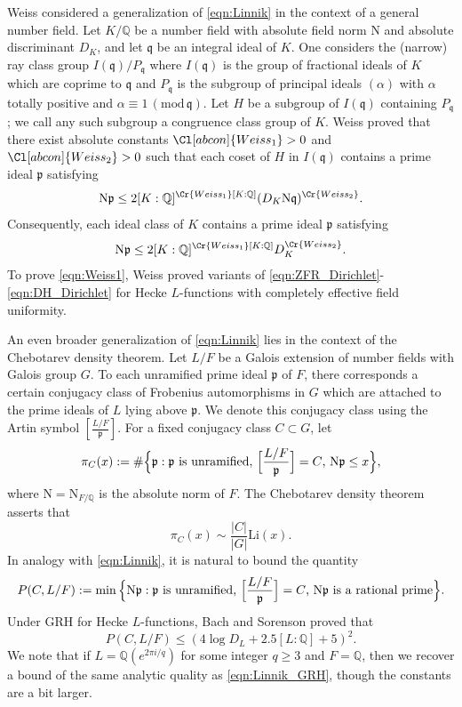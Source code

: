 \documentclass[12pt,psamsfonts]{amsart}
\theoremstyle{definition}
\theoremstyle{remark}
\numberwithin{equation}{section}
\theoremstyle{plain}
\theoremstyle{remark}
\renewcommand{\1}{ {\bf 1}}
\renewcommand{\pmod}[1]{\, (\mathrm{mod} {\, #1})}
\newcommand{\kp}{\mathfrak{p}}
\newcommand{\kq}{\mathfrak{q}}
\newcommand{\Q}{\mathbb{Q}}
\begin{document}
Weiss \cite{Weiss} considered a generalization of \eqref{eqn:Linnik} in the context of a general number field.  Let $K/\Q$ be a number field with absolute field norm $\mathrm{N}$ and absolute discriminant $D_K$, and let $\mathfrak{q}$ be an integral ideal of $K$.  One considers the (narrow) ray class group  $I(\mathfrak{q})/P_{\mathfrak{q}}$ where $I(\mathfrak{q})$ is the group of fractional ideals of $K$ which are coprime to $\mathfrak{q}$ and $P_{\mathfrak{q}}$ is the subgroup of principal ideals $(\alpha)$ with $\alpha$ totally positive and $\alpha \equiv 1 \pmod{\kq}$.  Let $H$ be a subgroup of $I(\kq)$ containing $P_{\kq}$; we call any such subgroup a congruence class group of $K$.  Weiss proved that there exist absolute constants $\Cl[abcon]{Weiss_1}>0$ and $\Cl[abcon]{Weiss_2}>0$ such that each coset of $H$ in $I(\kq)$ contains a prime ideal $\kp$ satisfying
\begin{equation}
\label{eqn:Weiss1}
\mathrm{N}\mathfrak{p}\leq 2[K:\Q]^{\Cr{Weiss_1}[K:\Q]}(D_K\mathrm{N}\mathfrak{q})^{\Cr{Weiss_2}}.
\end{equation}
Consequently, each ideal class of $K$ contains a prime ideal $\mathfrak{p}$ satisfying
\[
\mathrm{N}\mathfrak{p}\leq 2[K:\Q]^{\Cr{Weiss_1}[K:\Q]}D_K^{\Cr{Weiss_2}}.
\]
To prove \eqref{eqn:Weiss1}, Weiss proved variants of \eqref{eqn:ZFR_Dirichlet}-\eqref{eqn:DH_Dirichlet} for Hecke $L$-functions with completely effective field uniformity.

An even broader generalization of \eqref{eqn:Linnik} lies in the context of the Chebotarev density theorem.  Let $L/F$ be a Galois extension of number fields with Galois group $G$.  To each unramified prime ideal $\mathfrak{p}$ of $F$, there corresponds a certain conjugacy class of Frobenius automorphisms in $G$ which are attached to the prime ideals of $L$ lying above $\mathfrak{p}$.  We denote this conjugacy class using the Artin symbol $[\frac{L/F}{\mathfrak{p}}]$.  For a fixed conjugacy class $C\subset G$, let
\[
\pi_C(x):=\#\Big\{\mathfrak{p}:\textup{$\mathfrak{p}$ is unramified, $\Big[\frac{L/F}{\mathfrak{p}}\Big]=C$, $\mathrm{N}\mathfrak{p}\leq x$}\Big\},
\]
where $\mathrm{N}=\mathrm{N}_{F/\mathbb{Q}}$ is the absolute norm of $F$.  The Chebotarev density theorem asserts that
\[
\pi_C(x)\sim\frac{|C|}{|G|}\mathrm{Li}(x).
\]
In analogy with \eqref{eqn:Linnik}, it is natural to bound the quantity
\[
P(C,L/F):=\min \Big\{ \mathrm{N}\mathfrak{p} : \textup{$\mathfrak{p}$ is unramified, $\Big[\frac{L/F}{\mathfrak{p}}\Big]=C$, $\mathrm{N}\mathfrak{p}$ is a rational prime} \Big\}. 
\]
Under GRH for Hecke $L$-functions, Bach and Sorenson \cite{BS} proved that
\begin{equation}
\label{eqn:CDT_GRH}
P(C,L/F)\leq (4\log D_L+2.5 [L:\mathbb{Q}]+5)^2.
\end{equation}
We note that if $L=\mathbb{Q}(e^{2\pi i/q})$ for some integer $q\geq3$ and $F=\mathbb{Q}$, then we recover a bound of the same analytic quality as \eqref{eqn:Linnik_GRH}, though the constants are a bit larger.
\end{document}
